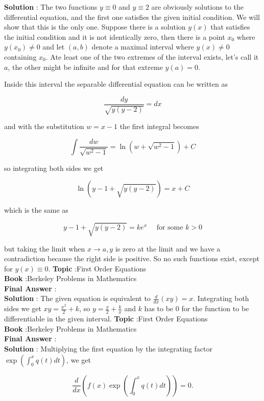 \documentclass[10pt]{article}
\begin{document}
\textbf{Solution} : The two functions $y \equiv 0$ and $y \equiv 2$ are obviously solutions to the differential equation, and the first one satisfies the given initial condition. We will show that this is the only one. Suppose there is a solution $y(x)$ that satisfies the initial condition and it is not identically zero, then there is a point $x_{0}$ where $y\left(x_{0}\right) \neq 0$ and let $(a, b)$ denote a maximal interval where $y(x) \neq 0$ containing $x_{0}$. Ate least one of the two extremes of the interval exists, let's call it $a$, the other might be infinite and for that extreme $y(a)=0$.

Inside this interval the separable differential equation can be written as

$$
\frac{d y}{\sqrt{y(y-2)}}=d x
$$

and with the substitution $w=x-1$ the first integral becomes

$$
\int \frac{d w}{\sqrt{w^{2}-1}}=\ln \left(w+\sqrt{w^{2}-1}\right)+C
$$

so integrating both sides we get

$$
\ln (y-1+\sqrt{y(y-2)})=x+C
$$

which is the same as

$$
y-1+\sqrt{y(y-2)}=k e^{x} \quad \text { for some } k>0
$$

but taking the limit when $x \rightarrow a, y$ is zero at the limit and we have a contradiction because the right side is positive. So no such functions exist, except for $y(x) \equiv 0$.
\textbf{Topic} :First Order Equations \\
\textbf{Book} :Berkeley Problems in Mathematics\\
\textbf{Final Answer} :\\


\textbf{Solution} : The given equation is equivalent to $\frac{d}{d x}(x y)=x$. Integrating both sides we get $x y=\frac{x^{2}}{2}+k$, so $y=\frac{x}{2}+\frac{k}{x}$ and $k$ has to be 0 for the function to be differentiable in the given interval.
\textbf{Topic} :First Order Equations \\
\textbf{Book} :Berkeley Problems in Mathematics\\
\textbf{Final Answer} :\\


\textbf{Solution} : Multiplying the first equation by the integrating factor $\exp \left(\int_{0}^{x} q(t) d t\right)$, we get

$$
\frac{d}{d x}\left(f(x) \exp \left(\int_{0}^{x} q(t) d t\right)\right)=0 .
$$
\end{document}
